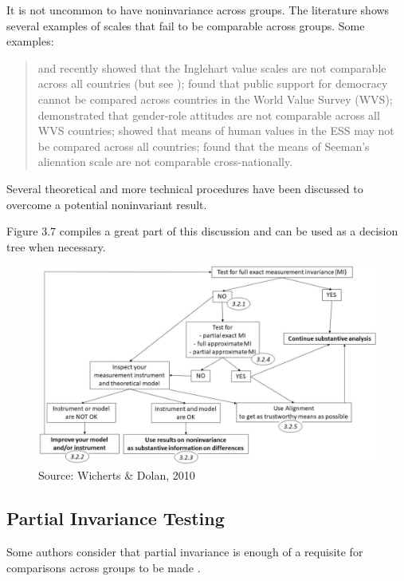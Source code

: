 \documentclass[
]{book}
\begin{document}
It is not uncommon to have noninvariance across groups. The literature shows several examples of scales that fail to be comparable across groups. Some examples:

\begin{quote}
\citet{Aleman2016} and \citet{SOKOLOV2018} recently showed that the Inglehart value scales are not comparable across all countries (but see \citet{Welzel2016}); \citet{Ariely2011} found that public support for democracy cannot be compared across countries in the World Value Survey (WVS); \citet{Lomazzi2017} demonstrated that gender-role attitudes are not comparable across all WVS countries; \citet{Davidov2008} showed that means of human values in the ESS may not be compared across all countries; \citet{Rudnev2018} found that the means of Seeman's alienation scale are not comparable cross-nationally.
\end{quote}

Several theoretical and more technical procedures have been discussed to overcome a potential noninvariant result.

Figure 3.7 compiles a great part of this discussion and can be used as a decision tree when necessary.

\begin{figure}
\includegraphics[width=0.8\linewidth]{decision_tree} \caption{Source: Wicherts & Dolan, 2010}\label{fig:tree}
\end{figure}

\hypertarget{partial-invariance-testing}{%
\subsection{Partial Invariance Testing}\label{partial-invariance-testing}}

Some authors consider that partial invariance is enough of a requisite for comparisons across groups to be made \citep{Byrne1989a, Steenkamp1998}.
\end{document}

